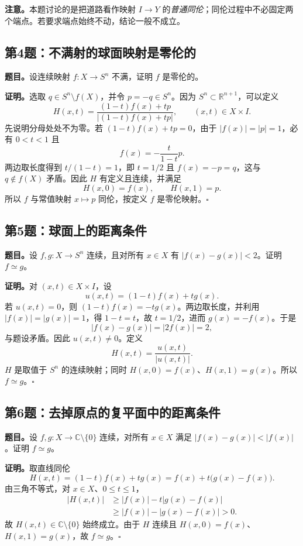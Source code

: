 \documentclass[UTF8,11pt,a4paper]{ctexart}
\newcommand{\R}{\mathbb R}
\newcommand{\C}{\mathbb C}
\newcommand{\pp}[1]{\bigl(#1\bigr)}
\begin{document}
\textbf{注意。}\;本题讨论的是把道路看作映射 \(I\to Y\) 的\emph{普通同伦}；同伦过程中不必固定两个端点。若要求端点始终不动，结论一般不成立。

\subsection*{第4题：不满射的球面映射是零伦的}
\textbf{题目。}\;设连续映射 \(f:X\to S^n\) 不满，证明 \(f\) 是零伦的。

\textbf{证明。}\;选取 \(q\in S^n\setminus f(X)\)，并令 \(p=-q\in S^n\)。因为 \(S^n\subset\R^{n+1}\)，可以定义
\[
 H(x,t)=\frac{(1-t)f(x)+tp}{\bigl|(1-t)f(x)+tp\bigr|},
 \qquad (x,t)\in X\times I.
\]
先说明分母处处不为零。若
\((1-t)f(x)+tp=0\)，由于 \(|f(x)|=|p|=1\)，必有 \(0<t<1\) 且
\[
 f(x)=-\frac{t}{1-t}p.
\]
两边取长度得到 \(t/(1-t)=1\)，即 \(t=1/2\) 且 \(f(x)=-p=q\)，这与 \(q\notin f(X)\) 矛盾。因此 \(H\) 有定义且连续，并满足
\[
 H(x,0)=f(x),\qquad H(x,1)=p.
\]
所以 \(f\) 与常值映射 \(x\mapsto p\) 同伦，按定义 \(f\) 是零伦映射。\hfill\(\square\)

\subsection*{第5题：球面上的距离条件}
\textbf{题目。}\;设 \(f,g:X\to S^n\) 连续，且对所有 \(x\in X\) 有 \(|f(x)-g(x)|<2\)。证明 \(f\simeq g\)。

\textbf{证明。}\;对 \((x,t)\in X\times I\)，设
\[
 u(x,t)=(1-t)f(x)+tg(x).
\]
若 \(u(x,t)=0\)，则 \((1-t)f(x)=-tg(x)\)。两边取长度，并利用
\(|f(x)|=|g(x)|=1\)，得 \(1-t=t\)，故 \(t=1/2\)，进而
\(g(x)=-f(x)\)。于是
\[
 |f(x)-g(x)|=|2f(x)|=2,
\]
与题设矛盾。因此 \(u(x,t)\ne0\)。定义
\[
 H(x,t)=\frac{u(x,t)}{|u(x,t)|}.
\]
\(H\) 是取值于 \(S^n\) 的连续映射；同时 \(H(x,0)=f(x)\)、\(H(x,1)=g(x)\)。所以 \(f\simeq g\)。\hfill\(\square\)

\subsection*{第6题：去掉原点的复平面中的距离条件}
\textbf{题目。}\;设 \(f,g:X\to\C\setminus\{0\}\) 连续，对所有 \(x\in X\) 满足 \(|f(x)-g(x)|<|f(x)|\)。证明 \(f\simeq g\)。

\textbf{证明。}\;取直线同伦
\[
 H(x,t)=(1-t)f(x)+tg(x)=f(x)+t\pp{g(x)-f(x)}.
\]
由三角不等式，对 \(x\in X\)、\(0\le t\le1\)，
\[
 \begin{aligned}
 |H(x,t)|&\ge |f(x)|-t|g(x)-f(x)|\\
 &\ge |f(x)|-|g(x)-f(x)|>0.
 \end{aligned}
\]
故 \(H(x,t)\in\C\setminus\{0\}\) 始终成立。由于 \(H\) 连续且
\(H(x,0)=f(x)\)、\(H(x,1)=g(x)\)，故 \(f\simeq g\)。\hfill\(\square\)
\end{document}
